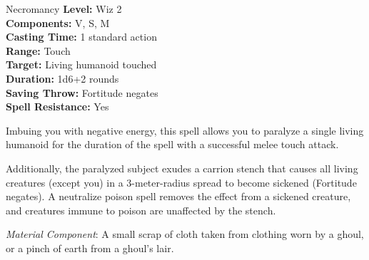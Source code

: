 {Necromancy}
{
	\textbf{Level:}
	Wiz 2\\
	\textbf{Components:}
	V, S, M\\
	\textbf{Casting Time:}
	1 standard action\\
	\textbf{Range:}
	Touch\\
	\textbf{Target:}
	Living humanoid touched\\
	\textbf{Duration:}
	1d6+2 rounds\\
	\textbf{Saving Throw:}
	Fortitude negates\\
	\textbf{Spell Resistance:}
	Yes\\
}
{
	Imbuing you with negative energy, this spell allows you to paralyze a single living humanoid for the duration of the spell with a successful melee touch attack.

	Additionally, the paralyzed subject exudes a carrion stench that causes all living creatures (except you) in a 3-meter-radius spread to become sickened (Fortitude negates). A neutralize poison spell removes the effect from a sickened creature, and creatures immune to poison are unaffected by the stench.

	\textit{Material Component}:
	A small scrap of cloth taken from clothing worn by a ghoul, or a pinch of earth from a ghoul's lair.

}
